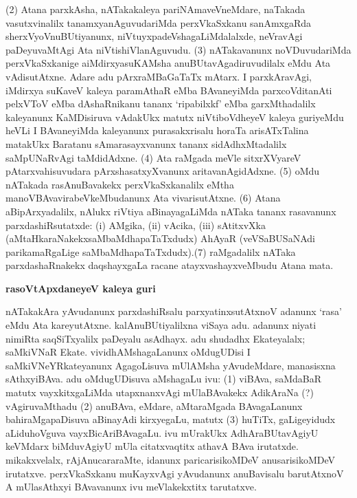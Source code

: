 (2) Atana parxkAsha, nATakakaleya pariNAmaveVneMdare, naTakada vasutxvinalilx tanamxya\-nAguvudariMda perxVkaSxkanu sanAmxgaRda sherxVyoVnuBUtiyanunx, niVtuyxpadeVshagaLiMdalalxde, neVravAgi paDeyuvaMtAgi Ata niVtishiVlanAguvudu. (3) nATakavanunx noVDuvuda\-riMda perxVkaSxkanige aiMdirxyasuKAMsha anuBUtavAgadiruvudilalx eMdu Ata vAdisu\-tAtxne. Adare adu pArxraMBaGaTaTx mAtarx. I parxkAravAgi, iMdirxya suKaveV kaleya paramAthaR eMba BAvaneyiMda parxcoVditanAti pelxVToV eMba dAshaRnikanu tananx `ripabilxkf' eMba garxMthadalilx kaleyanunx KaMDisiruva vAdakUkx matutx niVtiboVdheyeV kaleya guriyeMdu heVLi I BAvaneyiMda kaleyanunx purasakxrisalu horaTa arisATxTa\-lina matakUkx Baratanu sAmarasayxvanunx tananx sidAdhxMtadalilx saMpUNaRvAgi taMdidAdxne. (4) Ata raMgada meVle sitxrXVyareV pAtarxvahisuvudara pArxshasatxyXvanunx aritavanAgidAdxne. (5) oMdu nATakada rasAnuBavakekx perxVkaSxkanalilx eMtha manoVBAvavirabeVkeMbu\-danunx Ata vivarisutAtxne. (6) Atana aBipArxyadalilx, nAlukx riVtiya aBinayagaLiMda nATaka tananx rasavanunx parxdashiRsutatxde: {\rm(i)} AMgika, {\rm(ii)} vAcika, {\rm(iii)} sAtitxvXka (aMtaHkaraNakekx\break saMbaMdhapaTaTxdudx) AhAyaR (veVSaBUSaNAdi parikamaRgaLige saMbaMdhapaTaTxdudx).\break (7) raMgadalilx nATaka parxdashaRnakekx daqshayxgaLa racane atayxvashayxveMbudu Atana mata.

\bigskip
\begin{center}
{\Large\bf rasoVtApxdaneyeV kaleya guri}
\end{center}

nATakakAra yAvudanunx parxdashiRsalu parxyatinxsutAtxnoV adanunx `rasa' eMdu Ata kareyutAtxne. kalAnuBUtiyalilxna viSaya adu. adanunx niyati nimiRta saqSiTxyalilx paDeyalu asAdhayx. adu shudadhx Ekateyalalx; saMkiVNaR Ekate. vividhAMshagaLanunx oMdugUDisi I saMkiVNeYRkateyanunx AgagoLisuva mUlAMsha yAvudeMdare, manasisxna sAthxyiBAva. adu oMdugUDisuva aMshagaLu ivu: (1) viBAva, saMdaBaR matutx vayxkitxgaLiMda utapxnanxvAgi mUlaBAvakekx AdikAraNa (?) vAgiruvaMthadu (2) anuBAva, eMdare, aMtaraMgada BAvagaLanunx bahiraMgapaDisuva aBinayAdi kirxyegaLu, matutx (3) huTiTx, gaLigeyidudx aLiduhoVguva vayxBicAriBAvagaLu. ivu mUrakUkx AdhAraBUtavAgiyU keVMdarx biMduvAgiyU mUla citatxvaqtitx athavA BAva irutatxde. mikakxvelalx, rAjAnucararaMte, idanunx paricarisikoMDeV anusarisikoMDeV irutatxve. perxVkaSxkanu muKayxvAgi yAvudanunx anuBavisalu barutAtxnoV A mUlasAthxyi BAvavanunx ivu meVlakekxtitx tarutatxve.

